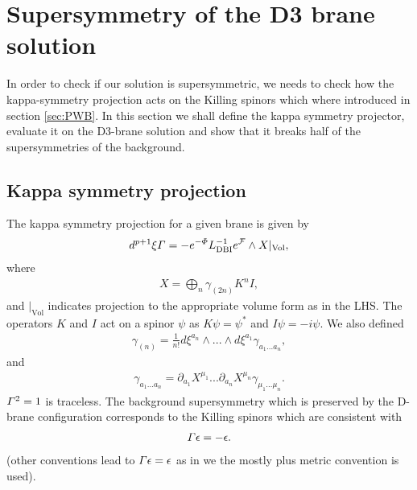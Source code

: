 \documentclass[11pt]{article}
\let\oldPhi=\Phi
\let\oldGamma=\Gamma
\renewcommand{\Phi}{\mathnormal{\oldPhi}}
\renewcommand{\Gamma}{\mathnormal{\oldGamma}}
\newcommand{\sfrac}[2]{{\textstyle\frac{#1}{#2}}}
\newcommand{\p}{\partial}\newcommand{\quarter}{\sfrac{1}{4}}
\begin{document}
\section{Supersymmetry of the D3 brane solution}

In order to check if our solution is supersymmetric,
we needs to check how the kappa-symmetry projection acts on the Killing spinors which where introduced in section \ref{sec:PWB}.
In this section we shall define the kappa symmetry projector, evaluate it on the D3-brane solution and show that it breaks half of the supersymmetries of the background.


\subsection{Kappa symmetry projection}

The kappa symmetry projection for a given brane is given by \cite{Skenderis:2002vf}
\begin{align}
d^{p+1} \xi \Gamma = - e^{-\Phi} L_{\text{DBI}}^{-1} e^{\mathcal{F}}\wedge X|_{\text{Vol}},
\end{align}
where
\begin{align}
X = \bigoplus_n \gamma_{(2n)} K^n I,
\end{align}
and $|_{\text{Vol}}$ indicates projection to the appropriate volume form as in the LHS.
The operators $K$ and $I$ act on a spinor $\psi$ as $K \psi = \psi^*$ and $I \psi = -i \psi$.
We also defined
\begin{align}
\gamma_{(n)} = \frac{1}{n !}d\xi^{a_n}\wedge ... \wedge d\xi^{a_1} \gamma_{a_1...a_n},
\end{align}
and
\begin{align}
\gamma_{a_1...a_n} = \p_{a_1} X^{\mu_1}...\p_{a_n} X^{\mu_n}\gamma_{\mu_1...\mu_n}.
\end{align}
$\Gamma^2 = 1$ is traceless.
The background supersymmetry which is preserved by the D-brane configuration corresponds to the Killing spinors which are consistent with
\begin{align}
\Gamma \epsilon = -\epsilon.
\end{align}
(other conventions lead to $\Gamma \epsilon = \epsilon$ as in \cite{Skenderis:2002vf} we the mostly plus metric convention is used).
\end{document}
